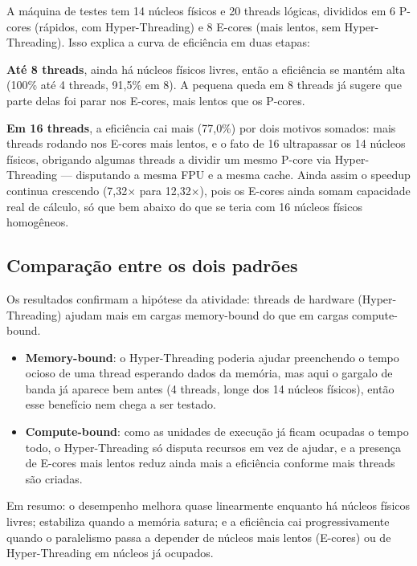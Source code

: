 \documentclass[a4paper,12pt]{article}
\begin{document}
A máquina de testes tem 14 núcleos físicos e 20 threads lógicas, divididos
em 6 P-cores (rápidos, com Hyper-Threading) e 8 E-cores (mais lentos, sem
Hyper-Threading). Isso explica a curva de eficiência em duas etapas:
 
\textbf{Até 8 threads}, ainda há núcleos físicos livres, então a eficiência
se mantém alta (100\% até 4 threads, 91{,}5\% em 8). A pequena queda em 8
threads já sugere que parte delas foi parar nos E-cores, mais lentos que os
P-cores.
 
\textbf{Em 16 threads}, a eficiência cai mais (77{,}0\%) por dois motivos
somados: mais threads rodando nos E-cores mais lentos, e o fato de 16
ultrapassar os 14 núcleos físicos, obrigando algumas threads a dividir um
mesmo P-core via Hyper-Threading — disputando a mesma FPU e a mesma cache.
Ainda assim o speedup continua crescendo (7{,}32$\times$ para
12{,}32$\times$), pois os E-cores ainda somam capacidade real de cálculo, só
que bem abaixo do que se teria com 16 núcleos físicos homogêneos.

\subsection{Comparação entre os dois padrões}

Os resultados confirmam a hipótese da atividade: threads de hardware
(Hyper-Threading) ajudam mais em cargas memory-bound do que em cargas
compute-bound.
 
\begin{itemize}
    \item \textbf{Memory-bound}: o Hyper-Threading poderia ajudar
    preenchendo o tempo ocioso de uma thread esperando dados da memória, mas
    aqui o gargalo de banda já aparece bem antes (4 threads, longe dos 14
    núcleos físicos), então esse benefício nem chega a ser testado.
    \item \textbf{Compute-bound}: como as unidades de execução já ficam
    ocupadas o tempo todo, o Hyper-Threading só disputa recursos em vez de
    ajudar, e a presença de E-cores mais lentos reduz ainda mais a
    eficiência conforme mais threads são criadas.
\end{itemize}
 
Em resumo: o desempenho melhora quase linearmente enquanto há núcleos
físicos livres; estabiliza quando a memória satura; e a eficiência cai
progressivamente quando o paralelismo passa a depender de núcleos mais
lentos (E-cores) ou de Hyper-Threading em núcleos já ocupados.
\end{document}
